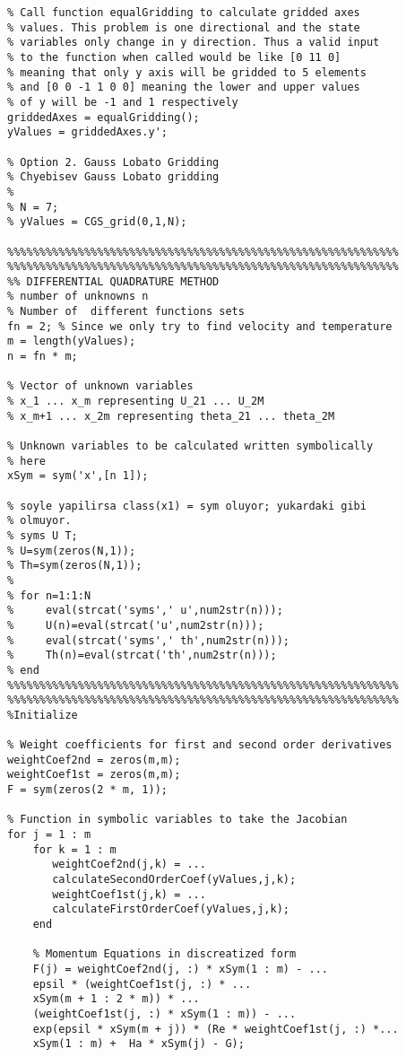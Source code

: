 \begin{lstlisting}
% Call function equalGridding to calculate gridded axes 
% values. This problem is one directional and the state 
% variables only change in y direction. Thus a valid input 
% to the function when called would be like [0 11 0] 
% meaning that only y axis will be gridded to 5 elements 
% and [0 0 -1 1 0 0] meaning the lower and upper values 
% of y will be -1 and 1 respectively
griddedAxes = equalGridding();
yValues = griddedAxes.y';

% Option 2. Gauss Lobato Gridding
% Chyebisev Gauss Lobato gridding
% 
% N = 7;
% yValues = CGS_grid(0,1,N);

%%%%%%%%%%%%%%%%%%%%%%%%%%%%%%%%%%%%%%%%%%%%%%%%%%%%%%%%%%%%%
%%%%%%%%%%%%%%%%%%%%%%%%%%%%%%%%%%%%%%%%%%%%%%%%%%%%%%%%%%%%%
%% DIFFERENTIAL QUADRATURE METHOD
% number of unknowns n
% Number of  different functions sets 
fn = 2; % Since we only try to find velocity and temperature
m = length(yValues);
n = fn * m;

% Vector of unknown variables 
% x_1 ... x_m representing U_21 ... U_2M
% x_m+1 ... x_2m representing theta_21 ... theta_2M

% Unknown variables to be calculated written symbolically 
% here
xSym = sym('x',[n 1]);

% soyle yapilirsa class(x1) = sym oluyor; yukardaki gibi 
% olmuyor.
% syms U T;
% U=sym(zeros(N,1));
% Th=sym(zeros(N,1));
% 
% for n=1:1:N
%     eval(strcat('syms',' u',num2str(n)));
%     U(n)=eval(strcat('u',num2str(n)));
%     eval(strcat('syms',' th',num2str(n)));
%     Th(n)=eval(strcat('th',num2str(n)));
% end
%%%%%%%%%%%%%%%%%%%%%%%%%%%%%%%%%%%%%%%%%%%%%%%%%%%%%%%%%%%%%
%%%%%%%%%%%%%%%%%%%%%%%%%%%%%%%%%%%%%%%%%%%%%%%%%%%%%%%%%%%%%
%Initialize

% Weight coefficients for first and second order derivatives
weightCoef2nd = zeros(m,m);
weightCoef1st = zeros(m,m);
F = sym(zeros(2 * m, 1));

% Function in symbolic variables to take the Jacobian
for j = 1 : m
    for k = 1 : m
       weightCoef2nd(j,k) = ...
       calculateSecondOrderCoef(yValues,j,k);
       weightCoef1st(j,k) = ...
       calculateFirstOrderCoef(yValues,j,k);
    end 
    
    % Momentum Equations in discreatized form
    F(j) = weightCoef2nd(j, :) * xSym(1 : m) - ...
    epsil * (weightCoef1st(j, :) * ... 
    xSym(m + 1 : 2 * m)) * ...
    (weightCoef1st(j, :) * xSym(1 : m)) - ...
    exp(epsil * xSym(m + j)) * (Re * weightCoef1st(j, :) *...
    xSym(1 : m) +  Ha * xSym(j) - G);
    

\end{lstlisting}
